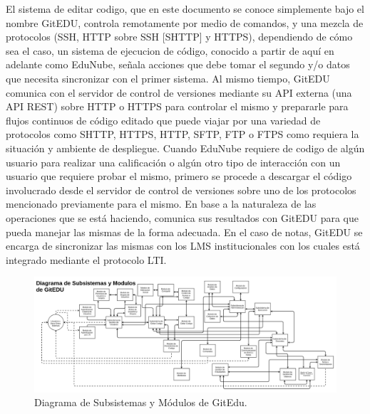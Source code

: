       
El sistema de editar codigo, que en este documento se conoce simplemente bajo el nombre GitEDU, controla remotamente por medio de comandos, y una mezcla de protocolos (SSH, HTTP sobre SSH [SHTTP] y HTTPS), dependiendo de cómo sea el caso, un sistema de ejecucion de código, conocido a partir de aquí en adelante como EduNube, señala acciones que debe tomar el segundo y/o datos que necesita sincronizar con el primer sistema. Al mismo tiempo, GitEDU comunica con el servidor de control de versiones mediante su API externa (una API REST) sobre HTTP o HTTPS para controlar el mismo y prepararle para flujos continuos de código editado que puede viajar por una variedad de protocolos como SHTTP, HTTPS, HTTP, SFTP, FTP o FTPS como requiera la situación y ambiente de despliegue. Cuando EduNube requiere de codigo de algún usuario para realizar una calificación o algún otro tipo de interacción con un usuario que requiere probar el mismo, primero se procede a descargar el código involucrado desde el servidor de control de versiones sobre uno de los protocolos mencionado previamente para el mismo. En base a la naturaleza de las operaciones que se está haciendo, comunica sus resultados con GitEDU para que pueda manejar las mismas de la forma adecuada. En el caso de notas, GitEDU se encarga de sincronizar las mismas con los LMS  institucionales con los cuales está integrado mediante el protocolo LTI.

\pagebreak

\begin{landscape}

	\begin{figure}
	  \begin{center}
	    \includegraphics[width=1.7\textwidth]{Figures/mod_ge.png}
	  \end{center}
	  \caption{Diagrama de Subsistemas y Módulos de GitEdu.}
	  \label{mod_ge}
	\end{figure}

\end{landscape}

